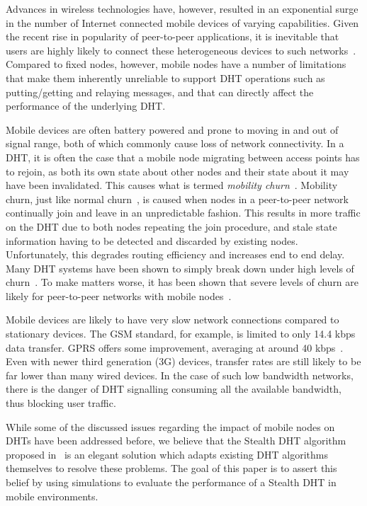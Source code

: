 \documentclass[conference]{IEEEtran}
\begin{document}
Advances in wireless technologies have, however, resulted in an
exponential surge in the number of Internet connected mobile devices
of varying capabilities. Given the recent rise in popularity of
peer-to-peer applications, it is inevitable that users are highly
likely to connect these heterogeneous devices to such
networks~\cite{sgg02}. Compared to fixed nodes, however, mobile
nodes have a number of limitations that make them inherently
unreliable to support DHT operations such as putting/getting and
relaying messages, and that can directly affect the performance of
the underlying DHT.

Mobile devices are often battery powered and prone to moving in and
out of signal range, both of which commonly cause loss of network
connectivity. In a DHT, it is often the case that a mobile node
migrating between access points has to rejoin, as both its own state
about other nodes and their state about it may have been
invalidated. This causes what is termed {\em mobility
churn}~\cite{mobilechurn}. Mobility churn, just like normal
churn~\cite{churn1}, is caused when nodes in a peer-to-peer network
continually join and leave in an unpredictable fashion. This results
in more traffic on the DHT due to both nodes repeating the join
procedure, and stale state information having to be detected and
discarded by existing nodes. Unfortunately, this degrades routing
efficiency and increases end to end delay. Many DHT systems have
been shown to simply break down under high levels of
churn~\cite{dhtcomparison}\cite{li04comparing}\cite{churn1}. To make
matters worse, it has been shown that severe levels of churn are
likely for peer-to-peer networks with mobile
nodes~\cite{mobilechurn}\cite{dhtmanet01}.

Mobile devices  are likely to have very slow network connections
compared to stationary devices. The GSM standard, for example, is
limited to only 14.4 kbps data transfer. GPRS offers some
improvement, averaging at around 40 kbps~\cite{mobilep2p3}. Even
with newer third generation (3G) devices, transfer rates are still
likely to be far lower than many wired devices. In the case of such
low bandwidth networks, there is the danger of DHT signalling
consuming all the available bandwidth, thus blocking user traffic.

While some of the discussed issues regarding the impact of mobile
nodes on DHTs have been addressed before, we believe that the
Stealth DHT algorithm proposed in~\cite{stealth1} is an elegant
solution which adapts existing DHT algorithms themselves to resolve
these problems. The goal of this paper is to assert this belief by
using simulations to evaluate the performance of a Stealth DHT in
mobile environments.
\end{document}
